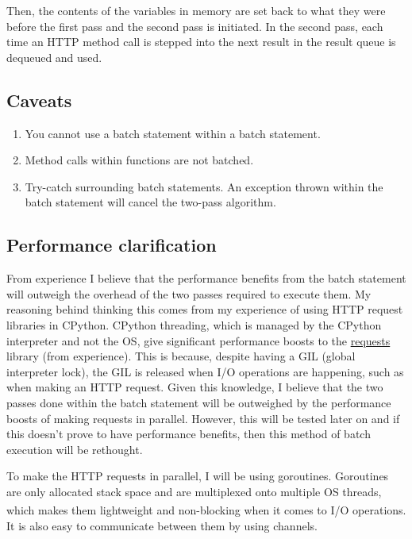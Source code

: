 \documentclass[]{interim}
\theoremstyle{definition}
\begin{document}
Then, the contents of the variables in memory are set back to what they were before the first pass and the second pass is initiated. In the second pass, each time an HTTP method call is stepped into the next result in the result queue is dequeued and used.

\subsection{Caveats}

\begin{enumerate}
    \item You cannot use a batch statement within a batch statement.
    \item Method calls within functions are not batched.
    \item Try-catch surrounding batch statements. An exception thrown within the batch statement will cancel the two-pass algorithm.
\end{enumerate}

\subsection{Performance clarification}

From experience I believe that the performance benefits from the batch statement will outweigh the overhead of the two passes required to execute them. My reasoning behind thinking this comes from my experience of using HTTP request libraries in CPython. CPython threading, which is managed by the CPython interpreter and not the OS, give significant performance boosts to the \href{https://docs.python-requests.org/en/latest/}{requests} library (from experience). This is because, despite having a GIL (global interpreter lock), the GIL is released when I/O operations are happening, such as when making an HTTP request. Given this knowledge, I believe that the two passes done within the batch statement will be outweighed by the performance boosts of making requests in parallel. However, this will be tested later on and if this doesn't prove to have performance benefits, then this method of batch execution will be rethought.

To make the HTTP requests in parallel, I will be using goroutines. Goroutines are only allocated stack space and are multiplexed onto multiple OS threads, which makes them lightweight and non-blocking when it comes to I/O operations\textsuperscript{\cite{effective-go}}. It is also easy to communicate between them by using channels.
\end{document}
